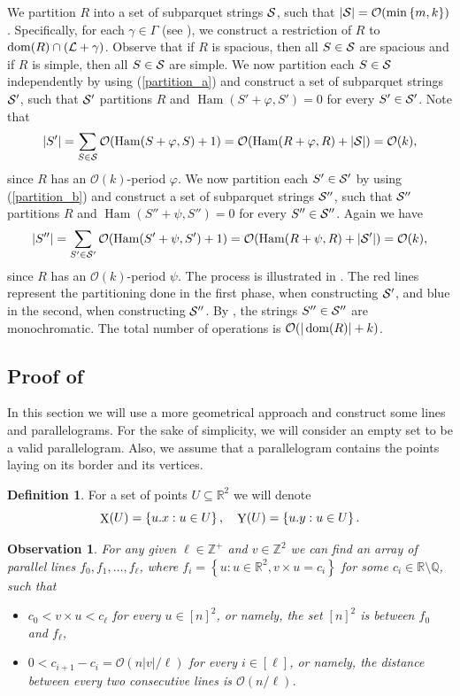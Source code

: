 \documentclass[11pt]{article}
\newcommand{\R}{\mathbb{R}}
\newcommand{\Z}{\mathbb{Z}}
\renewcommand{\O}{\mathcal{O}}
\renewcommand{\phi}{\varphi}
\newcommand{\set}[1]{\left\lbrace #1 \right\rbrace}
\theoremstyle{plain}
\newtheorem{observation}{Observation}
\theoremstyle{definition}
\newtheorem{definition}{Definition}
\theoremstyle{remark}
\DeclareMathOperator*{\X}{X}
\DeclareMathOperator*{\Y}{Y}
\DeclareMathOperator*{\Ham}{Ham}
\begin{document}
We partition $R$ into a set of subparquet strings $\S$, such that $|\S| = \O(\min\set{m, k})$.
Specifically, for each $\gamma \in \Gamma$ (see ), we construct a restriction of $R$ to $\d{R} \cap (\L + \gamma)$.
Observe that if $R$ is spacious, then all $S \in \S$ are spacious and if $R$ is simple, then all $S \in \S$ are simple.
We now partition each $S \in \S$ independently by using  (\ref{partition_a})
and construct a set of subparquet strings $\S'$, such that $\S'$ partitions $R$ and $\Ham(S' + \phi, S') = 0$ for every $S' \in \S'$.
Note that
\[ |S'| = \sum_{S \in \S} \O(\Ham(S + \phi, S) + 1) = \O(\Ham(R + \phi, R) + |\S|) = \O(k),\]
since $R$ has an $\O(k)$-period $\phi$.
We now partition each $S' \in \S'$ by using  (\ref{partition_b}) and construct a set of subparquet strings $\S''$, such that $\S''$ partitions $R$ and $\Ham(S'' + \psi, S'') = 0$ for every $S'' \in \S''$.
Again we have
\[ |S''| = \sum_{S' \in \S'} \O(\Ham(S' + \psi, S') + 1) = \O(\Ham(R + \psi, R) + |\S'|) = \O(k),\]
since $R$ has an $\O(k)$-period $\psi$.
The process is illustrated in .
The red lines represent the partitioning done in the first phase, when constructing $\S'$, and blue in the second, when constructing $\S''$.
By , the strings $S'' \in \S''$ are monochromatic.
The total number of operations is $\O(|\d{R}| + k)$.


\subsection{Proof of } \label{text_decomposition_proof}

In this section we will use a more geometrical approach and construct some lines and parallelograms.
For the sake of simplicity, we will consider an empty set to be a valid parallelogram.
Also, we assume that a parallelogram contains the points laying on its border and its vertices.



\begin{definition}
	For a set of points $U \subseteq \R^2$ we will denote
	\[ \X(U) = \set{\x{u} : u \in U}, \quad \Y(U) = \set{\y{u} : u \in U}.\]
\end{definition}

\newcommand{\IQ}{\mathbb{R} \setminus \mathbb{Q}}
\begin{observation}\label{line_existence}
	For any given $\ell \in \Z^+$ and $v \in \Z^2$ we can find an array of parallel lines $f_0, f_1, \dots, f_\ell$, where $f_i = \set{u : u \in \R^2, v \times u = c_i}$ for some $c_i \in \IQ$, such that
	\begin{itemize}
		\item $c_0 < v \times u < c_\ell$ for every $u \in [n]^2$, or namely, the set $[n]^2$ is between $f_0$ and $f_\ell$,
		\item $0 < c_{i + 1} - c_i = \O(n|v| / \ell)$ for every $i \in [\ell]$, or namely, the distance between every two consecutive lines is $\O(n / \ell)$.
	\end{itemize}
\end{observation}
\end{document}
